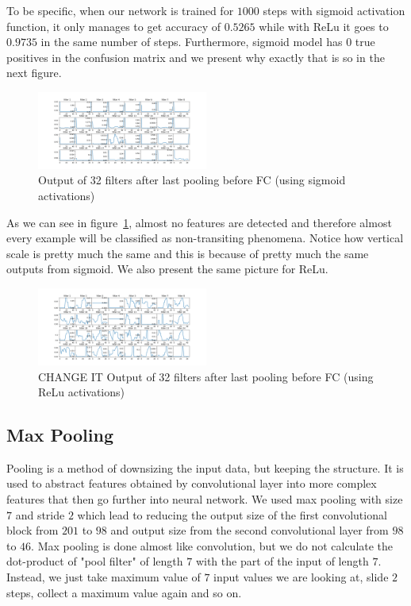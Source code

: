 \documentclass[twoside]{article}
\begin{document}
\begin{multicols}{2}
To be specific, when our network is trained for $1000$ steps with sigmoid activation function, it only manages to get accuracy of $0.5265$ while with ReLu it goes to $0.9735$ in the same number of steps. Furthermore, sigmoid model has $0$ true positives in the confusion matrix and we present why exactly that is so in the next figure.
\begin{figure}[H]
\includegraphics[width=0.5\textwidth]{sigmoid_pooling2}
\caption{Output of 32 filters after last pooling before FC (using sigmoid activations)}
\label{fig:sigmoid-pool2}
\end{figure}

As we can see in figure~\ref{fig:sigmoid-pool2}, almost no features are detected and therefore almost every example will be classified as non-transiting phenomena. Notice how vertical scale is pretty much the same and this is because of pretty much the same outputs from sigmoid. We also present the same picture for ReLu.
\begin{figure}[H]
\includegraphics[width=0.5\textwidth]{relu_pooling2}
\caption{CHANGE IT Output of 32 filters after last pooling before FC (using ReLu activations)}
\label{fig:relu-pool2}
\end{figure}

\subsection{Max Pooling}
Pooling is a method of downsizing the input data, but keeping the structure. It is used to abstract features obtained by convolutional layer into more complex features that then go further into neural network. We used max pooling with size $7$ and stride $2$ which lead to reducing the output size of the first convolutional block from $201$ to $98$ and output size from the second convolutional layer from $98$ to $46$. Max pooling is done almost like convolution, but we do not calculate the dot-product of "pool filter" of length $7$ with the part of the input of length $7$. Instead, we just take maximum value of $7$ input values we are looking at, slide $2$ steps, collect a maximum value again and so on.


\end{multicols}
\end{document}
